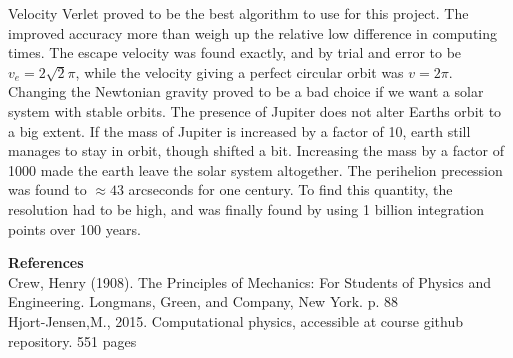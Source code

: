 \documentclass[10pt,a4paper]{article}
\begin{document}
\noindent Velocity Verlet proved to be the best algorithm to use for this project. The improved accuracy more than weigh up the relative low difference in computing times. The escape velocity was found exactly, and by trial and error to be $v_e = 2\sqrt{2}\pi$, while the velocity giving a perfect circular orbit was $v=2\pi$. Changing the Newtonian gravity proved to be a bad choice if we want a solar system with stable orbits. The presence of Jupiter does not alter Earths orbit to a big extent. If the mass of Jupiter is increased by a factor of 10, earth still manages to stay in orbit, though shifted a bit. Increasing the mass by a factor of 1000 made the earth leave the solar system altogether. The perihelion precession was found to $\approx 43$ arcseconds for one century. To find this quantity, the resolution had to be high, and was finally found by using 1 billion integration points over 100 years. 








\newpage
{\LARGE\bf
References
}\\
Crew, Henry (1908). The Principles of Mechanics: For Students of Physics and Engineering. Longmans, Green, and Company, New York. p. 88\\

\noindent Hjort-Jensen,M., 2015. Computational physics, accessible at course github
repository. 551 pages
\end{document}
